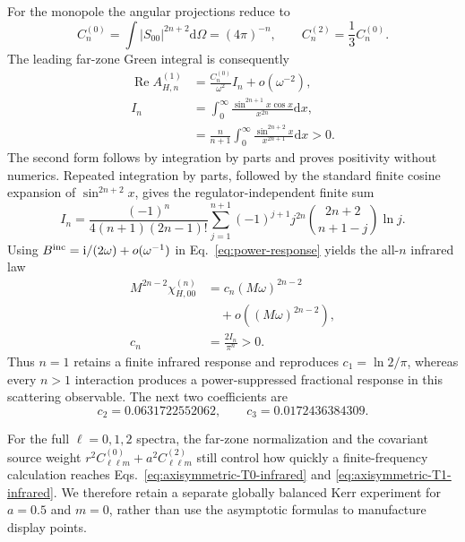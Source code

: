 \documentclass[aps,prd,twocolumn,10pt,nofootinbib,superscriptaddress,floatfix]{revtex4-2}
\newcommand{\dd}{\mathrm{d}}
\newcommand{\ii}{\mathrm{i}}
\begin{document}
For the monopole the angular projections reduce to
\begin{equation}
 C_n^{(0)}=\int|S_{00}|^{2n+2}\dd\Omega=(4\pi)^{-n},
 \qquad C_n^{(2)}=\frac13C_n^{(0)}.
 \label{eq:power-angular}
\end{equation}
The leading far-zone Green integral is consequently
\begin{align}
 \operatorname{Re}A_{H,n}^{(1)}
 &=\frac{C_n^{(0)}}{\omega^2}I_n+o(\omega^{-2}),\nonumber\\
 I_n&=\int_0^\infty
 \frac{\sin^{2n+1}x\cos x}{x^{2n}}\dd x,\nonumber\\
 &=\frac{n}{n+1}\int_0^\infty
 \frac{\sin^{2n+2}x}{x^{2n+1}}\dd x>0.
 \label{eq:power-integral}
\end{align}
The second form follows by integration by parts and proves positivity without
numerics.  Repeated integration by parts, followed by the standard finite
cosine expansion of $\sin^{2n+2}x$, gives the regulator-independent finite sum
\begin{equation}
 I_n=\frac{(-1)^n}{4(n+1)(2n-1)!}
 \sum_{j=1}^{n+1}(-1)^{j+1}j^{2n}
 \binom{2n+2}{n+1-j}\ln j .
 \label{eq:power-integral-sum}
\end{equation}
Using $B^{\rm inc}=\ii/(2\omega)+o(\omega^{-1})$ in
Eq.~\eqref{eq:power-response} yields the all-$n$ infrared law
\begin{align}
 M^{2n-2}\chi_{H,00}^{(n)}
 &=c_n(M\omega)^{2n-2}\nonumber\\
 &\quad+o\!\left((M\omega)^{2n-2}\right),
 \label{eq:power-infrared-law}\\
 c_n&=\frac{2I_n}{\pi^n}>0 .\nonumber
\end{align}
Thus $n=1$ retains a finite infrared response and reproduces
$c_1=\ln2/\pi$, whereas every $n>1$ interaction produces a
power-suppressed fractional response in this scattering observable.  The next two coefficients are
\begin{equation}
 c_2=0.0631722552062,\qquad c_3=0.0172436384309.
 \label{eq:power-coefficients}
\end{equation}

For the full $\ell=0,1,2$ spectra, the far-zone normalization and the
covariant source weight
$r^2C^{(0)}_{\ell\ell m}+a^2C^{(2)}_{\ell\ell m}$ still control how quickly a
finite-frequency calculation reaches Eqs.~\eqref{eq:axisymmetric-T0-infrared}
and \eqref{eq:axisymmetric-T1-infrared}.  We therefore retain a separate
globally balanced Kerr experiment for $a=0.5$ and $m=0$, rather than use the
asymptotic formulas to manufacture display points.
\end{document}
